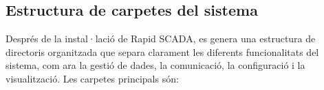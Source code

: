 \documentclass[12pt,a4paper]{report}
\begin{document}
%
%
%
%
%
%
%
%
%
%
%
\subsection{Estructura de carpetes del sistema}


Després de la instal·lació de Rapid SCADA, es genera una estructura de directoris organitzada que separa clarament les diferents funcionalitats del sistema, com ara la gestió de dades, la comunicació, la configuració i la visualització. Les carpetes principals són:
\end{document}
